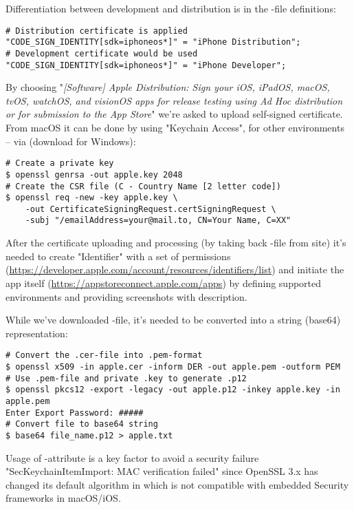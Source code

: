 Differentiation between development and distribution is in the -file definitions:

\begin{lstlisting}[language=terminal]
# Distribution certificate is applied
"CODE_SIGN_IDENTITY[sdk=iphoneos*]" = "iPhone Distribution";
# Development certificate would be used
"CODE_SIGN_IDENTITY[sdk=iphoneos*]" = "iPhone Developer";
\end{lstlisting}

By choosing "\emph{[Software] Apple Distribution: Sign your iOS, iPadOS, macOS, tvOS, watchOS, and visionOS apps for 
release testing using Ad Hoc distribution or for submission to the App Store}" we're asked to upload self-signed 
certificate. From macOS it can be done by using "Keychain Access", for other environments -- via  (download 
 for Windows):

\begin{lstlisting}[language=terminal]
# Create a private key
$ openssl genrsa -out apple.key 2048
# Create the CSR file (C - Country Name [2 letter code])
$ openssl req -new -key apple.key \ 
    -out CertificateSigningRequest.certSigningRequest \
    -subj "/emailAddress=your@mail.to, CN=Your Name, C=XX"
\end{lstlisting}

After the certificate uploading and processing (by taking back -file from site) it's needed to create 
"Identifier" with a set of permissions 
(\href{https://developer.apple.com/account/resources/identifiers/list}{https://developer.apple.com/account/resources/identifiers/list})
and initiate the app itself 
(\href{https://appstoreconnect.apple.com/apps}{https://appstoreconnect.apple.com/apps}) by defining supported 
environments and providing screenshots with description.

While we've downloaded -file, it's needed to be converted into a string (base64) representation:

\begin{lstlisting}[language=terminal]
# Convert the .cer-file into .pem-format
$ openssl x509 -in apple.cer -inform DER -out apple.pem -outform PEM
# Use .pem-file and private .key to generate .p12
$ openssl pkcs12 -export -legacy -out apple.p12 -inkey apple.key -in apple.pem
Enter Export Password: #####
# Convert file to base64 string
$ base64 file_name.p12 > apple.txt
\end{lstlisting}

\noindent Usage of -attribute is a key factor to avoid a security failure "SecKeychainItemImport: MAC 
verification failed" since OpenSSL 3.x has changed its default algorithm in  which is not compatible with 
embedded Security frameworks in macOS/iOS.

